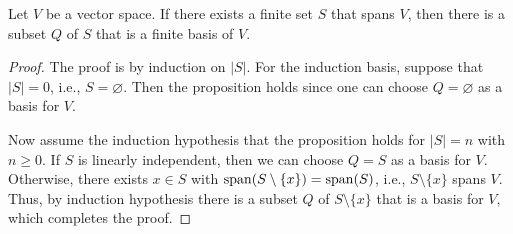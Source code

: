 \begin{proposition}\label{prop:finite-basis-existence}
  Let $V$ be a vector space.
  If there exists a finite set $S$ that spans $V$, then there is a subset
  $Q$ of $S$ that is a finite basis of $V$.
\end{proposition}
\begin{proof}
  The proof is by induction on $|S|$.
  For the induction basis, suppose that $|S| = 0$, i.e., $S = \varnothing$.
  Then the proposition holds since one can choose $Q = \varnothing$ as a basis
  for $V$.

  Now assume the induction hypothesis that the proposition holds for $|S| = n$
  with $n \geq 0$.
  If $S$ is linearly independent, then we can choose $Q = S$ as a basis for
  $V$.
  Otherwise, there exists $x \in S$ with $\operatorname{span}(S \setminus \{x\}) = \operatorname{span}(S)$,
  i.e., $S \setminus \{x\}$ spans $V$.
  Thus, by induction hypothesis there is a subset $Q$ of $S \setminus \{x\}$
  that is a basis for $V$, which completes the proof.
\end{proof}


